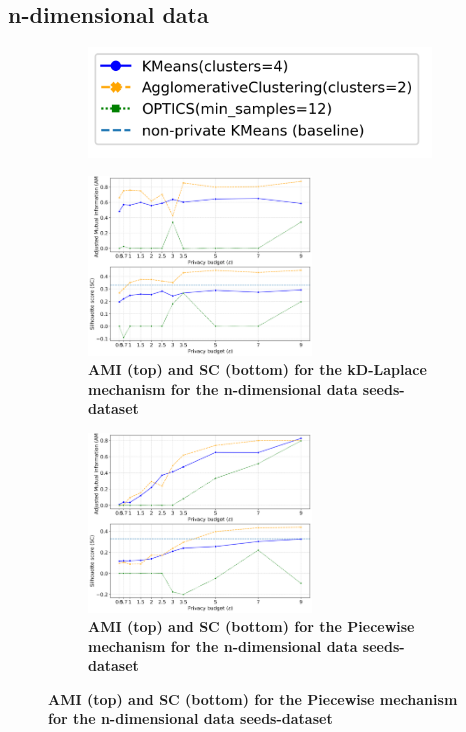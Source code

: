 \subsection{n-dimensional data}
\begin{figure}[H]
    \centering
    \begin{subfigure}{0.30\textwidth}
        \includegraphics[width=\textwidth]{Results/kd-laplace/kd-Laplace/seeds-dataset/legend_7.png}
    \end{subfigure}
    \begin{subfigure}{1\textwidth}
        \caption{\textbf{AMI (top) and SC (bottom) for the kD-Laplace mechanism for the n-dimensional data seeds-dataset}}
        \centering
        \includegraphics[width=0.65\textwidth]{Results/kd-laplace/kd-Laplace/seeds-dataset/ami-and-sc_7_dimensions.png}
        \centering
    \end{subfigure}
    \begin{subfigure}{1\textwidth}
        \caption{\textbf{AMI (top) and SC (bottom) for the Piecewise mechanism for the n-dimensional data seeds-dataset}}
        \centering
        \includegraphics[width=0.65\textwidth]{Results/kd-laplace/piecewise/seeds-dataset/ami-and-sc_7_dimensions.png}
    \end{subfigure}
    \label{fig:validation-seeds-dataset_comparison_nd-laplace}
\end{figure}

